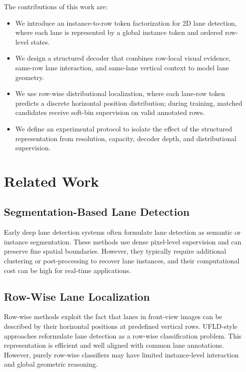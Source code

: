 \documentclass[conference]{IEEEtran}
\begin{document}
The contributions of this work are:

\begin{itemize}
    \item We introduce an instance-to-row token factorization for 2D lane detection, where each lane is represented by a global instance token and ordered row-level states.
    \item We design a structured decoder that combines row-local visual evidence, same-row lane interaction, and same-lane vertical context to model lane geometry.
    \item We use row-wise distributional localization, where each lane-row token predicts a discrete horizontal position distribution; during training, matched candidates receive soft-bin supervision on valid annotated rows.
    \item We define an experimental protocol to isolate the effect of the structured representation from resolution, capacity, decoder depth, and distributional supervision.
\end{itemize}

\section{Related Work}

\subsection{Segmentation-Based Lane Detection}

Early deep lane detection systems often formulate lane detection as semantic or instance segmentation. These methods use dense pixel-level supervision and can preserve fine spatial boundaries. However, they typically require additional clustering or post-processing to recover lane instances, and their computational cost can be high for real-time applications.

\subsection{Row-Wise Lane Localization}

Row-wise methods exploit the fact that lanes in front-view images can be described by their horizontal positions at predefined vertical rows. UFLD-style approaches reformulate lane detection as a row-wise classification problem. This representation is efficient and well aligned with common lane annotations. However, purely row-wise classifiers may have limited instance-level interaction and global geometric reasoning.
\end{document}
